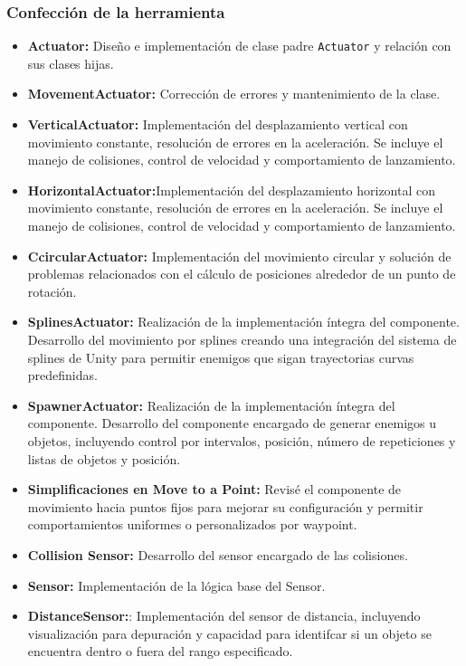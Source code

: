 \subsubsection{Confección de la herramienta}
\begin{itemize}
	\item \textbf{Actuator:} Diseño e implementación de clase padre \texttt{Actuator} y relación con sus clases hijas.
\item \textbf{MovementActuator:}  Corrección de errores y mantenimiento de la clase.
  \item \textbf{VerticalActuator:} Implementación del desplazamiento vertical con movimiento constante, resolución de errores en la aceleración. Se incluye el manejo
de colisiones, control de velocidad y comportamiento de lanzamiento.

  \item \textbf{HorizontalActuator:}Implementación del desplazamiento horizontal con movimiento constante, resolución de errores en la aceleración. Se incluye el manejo
de colisiones, control de velocidad y comportamiento de lanzamiento.
  \item \textbf{CcircularActuator:} Implementación del movimiento circular y solución de problemas relacionados con el cálculo de posiciones alrededor de un punto de rotación.
  \item \textbf{SplinesActuator:} Realización de la implementación íntegra del
componente. Desarrollo del movimiento por splines creando una integración del sistema de splines de Unity para permitir enemigos que sigan trayectorias curvas predefinidas.
  \item \textbf{SpawnerActuator:} Realización de la implementación íntegra del
componente. Desarrollo del componente encargado de generar enemigos u objetos, incluyendo control por intervalos, posición, número de repeticiones y listas de objetos y posición.
  \item \textbf{Simplificaciones en Move to a Point:} Revisé el componente de movimiento hacia puntos fijos para mejorar su configuración y permitir comportamientos uniformes o personalizados por waypoint.
  \item \textbf{Collision Sensor:}  Desarrollo del sensor encargado de las colisiones.
  \item \textbf{Sensor:} Implementación de la lógica base del Sensor. 
  \item \textbf{DistanceSensor:}: Implementación del sensor de distancia, incluyendo visualización para depuración y capacidad para identifcar si un objeto se encuentra dentro o fuera del rango especificado.

\end{itemize}
